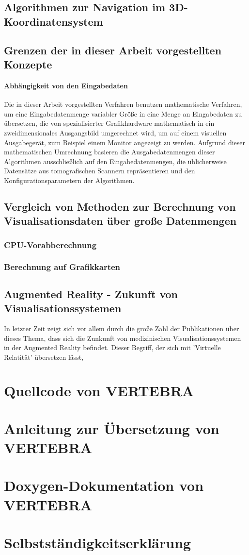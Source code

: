\documentclass[a4paper]{scrartcl}
\begin{document}
\subsection{Algorithmen zur Navigation im 3D-Koordinatensystem}
\subsection{Grenzen der in dieser Arbeit vorgestellten Konzepte}
\paragraph{Abhängigkeit von den Eingabedaten}
Die in dieser Arbeit vorgestellten Verfahren benutzen mathematische Verfahren, um eine Eingabedatenmenge variabler Größe
in eine Menge an Eingabedaten zu übersetzen, die von spezialisierter Grafikhardware mathematisch in ein zweidimensionales Ausgangsbild
umgerechnet wird, um auf einem visuellen Ausgabegerät, zum Beispiel einem Monitor angezeigt zu werden. Aufgrund dieser mathematischen
Umrechnung basieren die Ausgabedatenmengen dieser Algorithmen ausschließlich auf den Eingabedatenmengen, die üblicherweise Datensätze aus
tomografischen Scannern repräsentieren und den Konfigurationsparametern der Algorithmen.
\subsection{Vergleich von Methoden zur Berechnung von Visualisationsdaten über große Datenmengen}
\subsubsection{CPU-Vorabberechnung}
\subsubsection{Berechnung auf Grafikkarten}
\subsection{Augmented Reality - Zukunft von Visualisationssystemen}
In letzter Zeit zeigt sich vor allem durch die große Zahl der Publikationen über dieses Thema, dass sich die Zunkunft von medizinischen
Visualisationssystemen in der Augmented Reality befindet. Dieser Begriff, der sich mit 'Virtuelle Relatität' übersetzen lässt, \cite{Botden2009}
\appendix
\section{Quellcode von VERTEBRA}
\section{Anleitung zur Übersetzung von VERTEBRA}
\section{Doxygen-Dokumentation von VERTEBRA}
\section{Selbstständigkeitserklärung}


\end{document}
